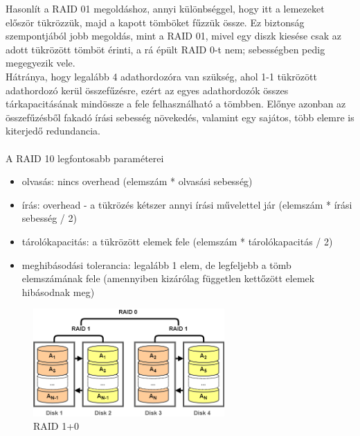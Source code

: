 \documentclass[tikz,12pt,margin=0px]{article}
\begin{document}
    {\footnotesize \noindent {\color{blue} \faLightbulbO\ $\triangleright$ } }
    {\footnotesize
    \noindent Hasonlít a RAID 01 megoldáshoz, annyi különbséggel, hogy itt a lemezeket először tükrözzük, majd a kapott tömböket fűzzük össze. Ez biztonság szempontjából jobb megoldás, mint a RAID 01, mivel egy diszk kiesése csak az adott tükrözött tömböt érinti, a rá épült RAID 0-t nem; sebességben pedig megegyezik vele.\\

    \noindent Hátránya, hogy legalább 4 adathordozóra van szükség, ahol 1-1 tükrözött adathordozó kerül összefűzésre, ezért az egyes adathordozók összes tárkapacitásának mindössze a fele felhasználható a tömbben. Előnye azonban az összefűzésből fakadó írási sebesség növekedés, valamint egy sajátos, több elemre is kiterjedő redundancia.\\\\

    \noindent A RAID 10 legfontosabb paraméterei
    \begin{itemize}[topsep=8pt,itemsep=4pt,partopsep=4pt, parsep=4pt]
        \item olvasás: nincs overhead (elemszám * olvasási sebesség)
        \item írás: overhead - a tükrözés kétszer annyi írási művelettel jár (elemszám * írási sebesség / 2)
        \item tárolókapacitás: a tükrözött elemek fele (elemszám * tárolókapacitás / 2)
        \item meghibásodási tolerancia: legalább 1 elem, de legfeljebb a tömb elemszámának fele (amennyiben kizárólag független kettőzött elemek hibásodnak meg)
    \end{itemize}
    }

    \begin{figure}[H]
        \centering
        \includegraphics[width=0.65\textwidth]{img/raid1+0.png}
        \caption{RAID 1+0}
        \label{ref:raid10}
    \end{figure}
\end{document}
